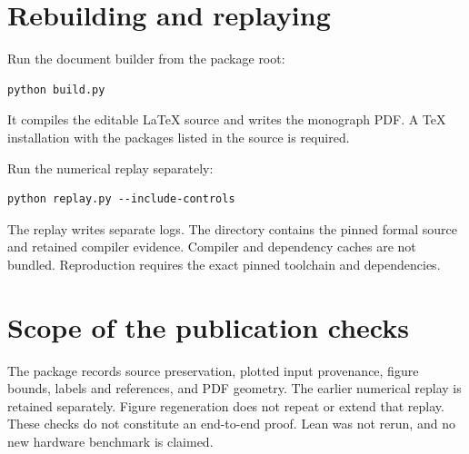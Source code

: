 \section{Rebuilding and replaying}
Run the document builder from the package root:
\begin{lstlisting}
python build.py
\end{lstlisting}
It compiles the editable LaTeX source and writes the monograph PDF. A TeX
installation with the packages listed in the source is required.

Run the numerical replay separately:
\begin{lstlisting}
python replay.py --include-controls
\end{lstlisting}
The replay writes separate logs. The  directory contains the pinned formal source and retained compiler evidence. Compiler and dependency caches are not bundled. Reproduction requires the exact pinned toolchain and dependencies.

\section{Scope of the publication checks}
The package records source preservation, plotted input provenance, figure bounds, labels and references, and PDF geometry. The earlier numerical replay is retained separately. Figure regeneration does not repeat or extend that replay. These checks do not constitute an end-to-end proof. Lean was not rerun, and no new hardware benchmark is claimed.
